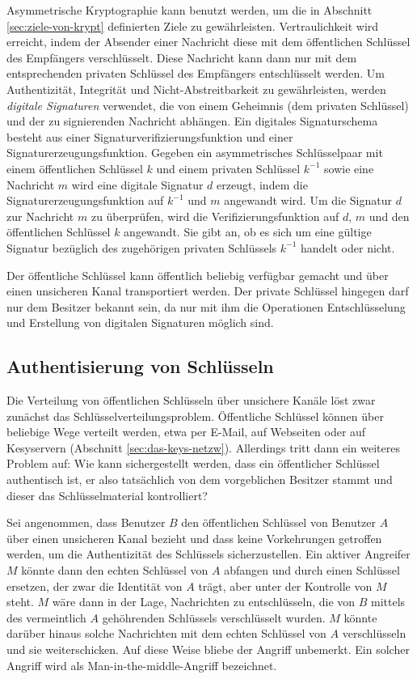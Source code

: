 Asymmetrische Kryptographie kann benutzt werden, um die in Abschnitt
\ref{sec:ziele-von-krypt} definierten Ziele zu
gew\"ahrleisten. Vertraulichkeit wird erreicht, indem der Absender
einer Nachricht diese mit dem \"offentlichen Schl\"ussel des
Empf\"angers verschl\"usselt. Diese Nachricht kann dann nur mit dem
entsprechenden privaten Schl\"ussel des Empf\"angers entschl\"usselt
werden. Um Authentizit\"at, Integrit\"at und Nicht-Abstreitbarkeit zu
gew\"ahrleisten, werden \emph{digitale Signaturen} verwendet, die von
einem Geheimnis (dem privaten Schl\"ussel) und der zu signierenden
Nachricht abh\"angen. Ein digitales Signaturschema besteht aus einer
Signaturverifizierungsfunktion und einer
Signaturerzeugungsfunktion. Gegeben ein asymmetrisches Schl\"usselpaar
mit einem \"offentlichen Schl\"ussel $k$ und einem privaten
Schl\"ussel $k^{-1}$ sowie eine Nachricht $m$ wird eine digitale
Signatur $d$ erzeugt, indem die Signaturerzeugungsfunktion auf
$k^{-1}$ und $m$ angewandt wird. Um die Signatur $d$ zur Nachricht $m$
zu \"uberpr\"ufen, wird die Verifizierungsfunktion auf $d$, $m$ und
den \"offentlichen Schl\"ussel $k$ angewandt. Sie gibt an, ob es sich
um eine g\"ultige Signatur bez\"uglich des zugeh\"origen privaten
Schl\"ussels $k^{-1}$ handelt oder nicht.

Der \"offentliche Schl\"ussel kann \"offentlich beliebig verf\"ugbar
gemacht und \"uber einen unsicheren Kanal transportiert werden. Der
private Schl\"ussel hingegen darf nur dem Besitzer bekannt sein, da
nur mit ihm die Operationen Entschl\"usselung und Erstellung von
digitalen Signaturen m\"oglich sind.

\subsection{Authentisierung von Schlüsseln}
\label{ch:Grundlagen:sec:PublicKeyCrypto:subsec:KeyAuth}
Die Verteilung von \"offentlichen Schl\"usseln \"uber unsichere
Kan\"ale l\"ost zwar zun\"achst das
Schl\"usselverteilungsproblem. \"Offentliche Schl\"ussel k\"onnen
\"uber beliebige Wege verteilt werden, etwa per E-Mail, auf Webseiten
oder auf Kesyservern (Abschnitt \ref{sec:das-keys-netzw}). Allerdings
tritt dann ein weiteres Problem auf: Wie kann sichergestellt werden,
dass ein \"offentlicher Schl\"ussel authentisch ist, er also
tats\"achlich von dem vorgeblichen Besitzer stammt und dieser das
Schl\"usselmaterial kontrolliert?

Sei angenommen, dass Benutzer $B$ den \"offentlichen Schl\"ussel von
Benutzer $A$ \"uber einen unsicheren Kanal bezieht und dass keine
Vorkehrungen getroffen werden, um die Authentizit\"at des Schl\"ussels
sicherzustellen. Ein aktiver Angreifer $M$ k\"onnte dann den echten
Schl\"ussel von $A$ abfangen und durch einen Schl\"ussel ersetzen, der
zwar die Identit\"at von $A$ tr\"agt, aber unter der Kontrolle von $M$
steht. $M$ w\"are dann in der Lage, Nachrichten zu entschl\"usseln,
die von $B$ mittels des vermeintlich $A$ geh\"ohrenden Schl\"ussels
verschl\"usselt wurden. $M$ k\"onnte dar\"uber hinaus solche
Nachrichten mit dem echten Schl\"ussel von $A$ verschl\"usseln und sie
weiterschicken. Auf diese Weise bliebe der Angriff unbemerkt. Ein
solcher Angriff wird als Man-in-the-middle-Angriff bezeichnet.

